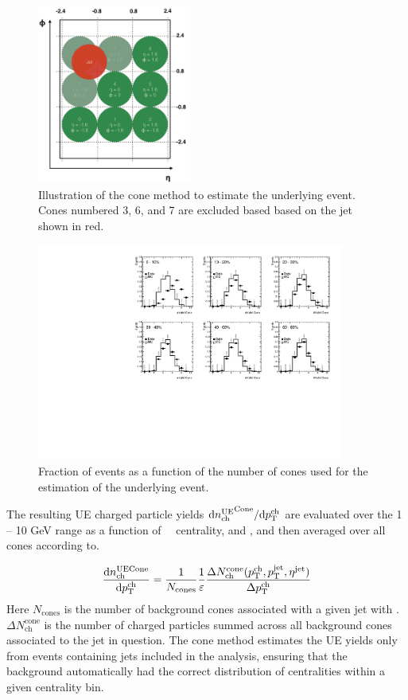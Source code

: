 \begin{figure}
\centering
\includegraphics[width=0.45\textwidth]{figures/main/UE/cone_grid.pdf}
\caption{Illustration of the cone method to estimate the underlying event.
Cones numbered 3, 6, and 7 are excluded based based on the jet shown in red.}
\label{fig:cone_grid}
\end{figure}   

\begin{figure}
\centering
\includegraphics[width=0.9\textwidth]{figures/main/UE/cone_stats}
\caption{Fraction of events as a function of the number of cones used for the estimation of the underlying event.}
\label{fig:cone_stats}
\end{figure}   

The resulting UE charged particle yields $\mathrm{d} \mbox{$n_{\mathrm{ch}}^{\mathrm{UE}}$}^{\mathrm{Cone}}/ \mathrm{d} \mbox{$p_{{\mathrm{T}}}^{\mathrm{ch}}$}$ are evaluated over the 1 -- 10 GeV range as a function of \pt\, \ptjet\, centrality, and \rvar, and then averaged over all cones according to.

\begin{eqnarray}
\frac{\mathrm{d} n_{\mathrm{ch}}^{\mathrm{UE Cone}}}{\mathrm{d} \mbox{$p_{{\mathrm{T}}}^{\mathrm{ch}}$}}  = \frac{1}{N_{\mathrm{cones}}} \frac{1}{\varepsilon} \frac{\Delta N^{\mathrm{cone}}_{\mathrm{ch}} (\mbox{$p_{{\mathrm{T}}}^{\mathrm{ch}}$}, \mbox{$p_{\mathrm{T}}^{\mathrm{jet}}$}, \mbox{$\eta^{\mathrm{jet}}$})}{\Delta \mbox{$p_{{\mathrm{T}}}^{\mathrm{ch}}$}}
\end{eqnarray}
Here $N_{\mathrm{cones}}$ is the number of background cones associated with a given jet with \ptjet.
$\Delta N^{\mathrm{cone}}_{\mathrm{ch}}$ is the number of charged particles summed across all background cones associated to the jet in question.
The cone method estimates the UE yields only from events containing jets included in the analysis, ensuring that the background automatically had the correct distribution of centralities within a given centrality bin.

